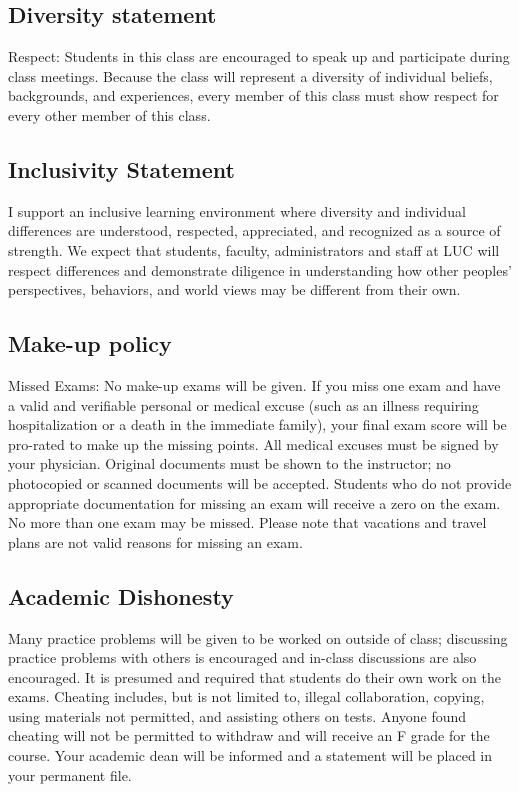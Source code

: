 \documentclass{article}\usepackage[]{graphicx}\usepackage[]{color}
\begin{document}
\subsection*{Diversity statement}
Respect: Students in this class are encouraged to speak up and participate during class
meetings. Because the class will represent a diversity of individual beliefs, backgrounds, and experiences, every member of this class must show respect for every other member of this class. 

\subsection*{Inclusivity Statement}
I support an inclusive learning environment where diversity and individual differences are understood, respected, appreciated, and recognized as a source of strength. We expect that students, faculty, administrators and staff at LUC will respect differences and demonstrate diligence in understanding how other peoples' perspectives, behaviors, and world views may be different from their own. 

\subsection*{Make-up policy}
Missed Exams:  No make-up exams will be given. If you miss one exam and have a valid and verifiable personal or medical excuse (such as an illness requiring hospitalization or a death in the immediate family), your final exam score will be pro-rated to make up the missing points. All medical excuses must be signed by your physician. Original documents must be shown to the instructor; no photocopied or scanned documents will be accepted. Students who do not provide appropriate documentation for missing an exam will receive a zero on the exam. No more than one exam may be missed. Please note that vacations and travel plans are not valid reasons for missing an exam.

\subsection*{Academic Dishonesty}
Many practice problems will be given to be worked on outside of class; discussing practice problems with others is encouraged and in-class discussions are also encouraged. It is presumed and required that students do their own work on the exams. Cheating includes, but is not limited to, illegal collaboration, copying, using materials not permitted, and assisting others on tests. Anyone found cheating will not be permitted to withdraw and will receive an F grade for the course. Your academic dean will be informed and a statement will be placed in your permanent file.\\
\end{document}
